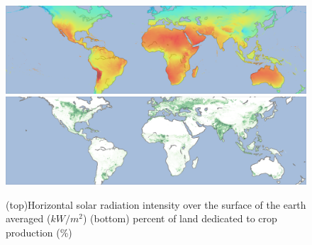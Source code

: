 \begin{figure}
    \centering
    \includegraphics[width=1\textwidth]{Figures/solar_map.png}
    \includegraphics[width=1\textwidth]{Figures/croplands_map.png}
    \caption{(top)Horizontal solar radiation intensity over the surface of the earth averaged ($kW/m^2$) (bottom) percent of land dedicated to crop production (\%)}
    \label{fig:usemap}
\end{figure}



